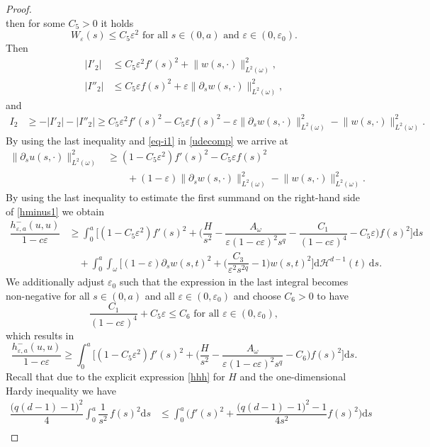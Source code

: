 \documentclass[10pt,a4paper]{amsart}
\newcommand{\dd}{\mathrm{d}}
\newcommand{\eps}{\varepsilon}
\renewcommand{\H}{\mathcal{H}}
\begin{document}
\begin{proof}
\[\]
then for some $C_5>0$ it holds
\[
W_\eps(s)\le C_5\eps^2\text{ for all $s\in(0,a)$ and $\eps\in(0,\eps_0)$.}
\]
Then
\begin{align*}
	|I'_2|&\le C_5\eps^2 f'(s)^2+\big\|w(s,\cdot)\big\|^2_{L^2(\omega)},\\
	|I''_2|&\le C_5\eps f(s)^2+\eps\big\|\partial_s w(s,\cdot)\big\|^2_{L^2(\omega)},
\end{align*}
and
\begin{align*}
	I_2&\ge -|I'_2|-|I''_2|\ge C_5\eps^2 f'(s)^2- C_5\eps f(s)^2-\eps\big\|\partial_s w(s,\cdot)\big\|^2_{L^2(\omega)}
	-\big\|w(s,\cdot)\big\|^2_{L^2(\omega)}.
\end{align*}
By using the last inequality and \eqref{eq-i1} in \eqref{udecomp} we arrive at
\begin{align*}
	\big\|\partial_s u(s,\cdot)\big\|^2_{L^2(\omega)}&\ge (1-C_5\eps^2)f'(s)^2-C_5\eps f(s)^2\\
	&\qquad +(1-\eps)\big\|\partial_s w(s,\cdot)\big\|^2_{L^2(\omega)}-\big\|w(s,\cdot)\big\|^2_{L^2(\omega)}.
\end{align*}
By using the last inequality to estimate the first summand on the right-hand side of \eqref{hminus1}
we obtain
\begin{align*}
		\dfrac{h^-_{\eps,a}(u,u)}{1-c\eps}&\ge 
		\int_0^a\bigg[(1-C_5\eps^2)f'(s)^2+\bigg(\dfrac{H}{s^2}
		-\dfrac{A_\omega}{\eps(1-c\eps)^2 s^q}-\dfrac{C_1}{(1-c\eps)^4}-C_5\eps\bigg)
		f(s)^2	\bigg]\dd s\\
		&\quad+\int_0^a\int_\omega \bigg[(1-\eps)\partial_s w(s,t)^2+\bigg(\dfrac{C_3}{\eps^2 s^{2q}}
		-1\bigg)w(s,t)^2\bigg]\dd\H^{d-1}(t)\,\dd s.
\end{align*}
We additionally adjust $\eps_0$ such that the expression in the last integral
becomes non-negative for all $s\in(0,a)$ and all $\eps\in(0,\eps_0)$ and choose $C_6>0$
to have
\[
\dfrac{C_1}{(1-c\eps)^4}+C_5\eps \le C_6 \text{ for all }\eps\in(0,\eps_0),
\]
which results in
\begin{equation}
	\label{hminus3}
	\dfrac{h^-_{\eps,a}(u,u)}{1-c\eps}\ge \int_0^a\bigg[(1-C_5\eps^2)f'(s)^2 
	+\bigg(\dfrac{H}{s^2}
	-\dfrac{A_\omega}{\eps(1-c\eps)^2 s^q}-C_6\bigg)
	f(s)^2	\bigg]\dd s.
\end{equation}
Recall that due to the explicit expression \eqref{hhh} for $H$ and the one-dimensional Hardy inequality we have
\begin{align*}
\dfrac{\big(q(d-1)-1\big)^2}{4}\int_0^a \dfrac{1}{s^2}\, f(s)^2\dd s
&\le \int_0^a \bigg(f'(s)^2+\dfrac{\big(q(d-1)-1\big)^2-1}{4 s^2}f(s)^2\bigg)\dd s\\

\end{align*}
\end{proof}
\end{document}
